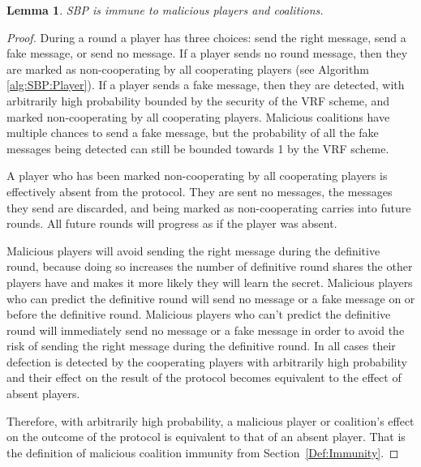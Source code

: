 \documentclass[12pt]{dalcsthesis}
\newtheorem{lemma}{Lemma}
\begin{document}
\begin{lemma}\label{Lem:SBPMalImmune}SBP is immune to malicious players and coalitions.\end{lemma}
\begin{proof}
During a round a player has three choices: send the right message, send a fake message, or send no message. If a player sends no round message, then they are marked as non-cooperating by all cooperating players (see Algorithm \ref{alg:SBP:Player}). If a player sends a fake message, then they are detected, with arbitrarily high probability bounded by the security of the VRF scheme, and marked non-cooperating by all cooperating players. Malicious coalitions have multiple chances to send a fake message, but the probability of all the fake messages being detected can still be bounded towards 1 by the VRF scheme. 

A player who has been marked non-cooperating by all cooperating players is effectively absent from the protocol. They are sent no messages, the messages they send are discarded, and being marked as non-cooperating carries into future rounds. All future rounds will progress as if the player was absent.

Malicious players will avoid sending the right message during the definitive round, because doing so increases the number of definitive round shares the other players have and makes it more likely they will learn the secret. Malicious players who can predict the definitive round will send no message or a fake message on or before the definitive round. Malicious players who can't predict the definitive round will immediately send no message or a fake message in order to avoid the risk of sending the right message during the definitive round. In all cases their defection is detected by the cooperating players with arbitrarily high probability and their effect on the result of the protocol becomes equivalent to the effect of absent players.

Therefore, with arbitrarily high probability, a malicious player or coalition's effect on the outcome of the protocol is equivalent to that of an absent player. That is the definition of malicious coalition immunity from Section~\ref{Def:Immunity}.
\end{proof}
\end{document}
